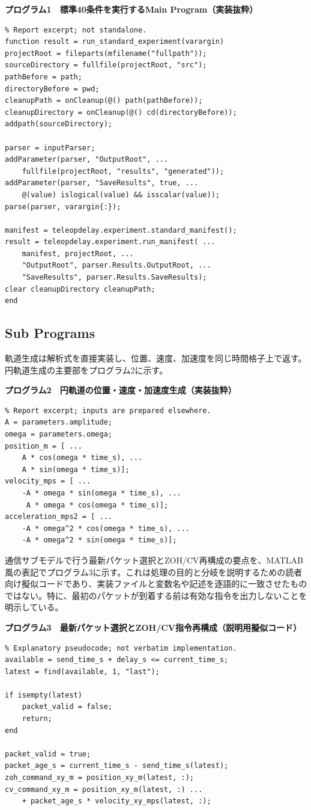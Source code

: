 \documentclass[11pt,a4paper]{article}
\begin{document}
\noindent\textbf{プログラム1　標準40条件を実行するMain Program（実装抜粋）}
\begin{lstlisting}
% Report excerpt; not standalone.
function result = run_standard_experiment(varargin)
projectRoot = fileparts(mfilename("fullpath"));
sourceDirectory = fullfile(projectRoot, "src");
pathBefore = path;
directoryBefore = pwd;
cleanupPath = onCleanup(@() path(pathBefore));
cleanupDirectory = onCleanup(@() cd(directoryBefore));
addpath(sourceDirectory);

parser = inputParser;
addParameter(parser, "OutputRoot", ...
    fullfile(projectRoot, "results", "generated"));
addParameter(parser, "SaveResults", true, ...
    @(value) islogical(value) && isscalar(value));
parse(parser, varargin{:});

manifest = teleopdelay.experiment.standard_manifest();
result = teleopdelay.experiment.run_manifest( ...
    manifest, projectRoot, ...
    "OutputRoot", parser.Results.OutputRoot, ...
    "SaveResults", parser.Results.SaveResults);
clear cleanupDirectory cleanupPath;
end
\end{lstlisting}

\subsection{Sub Programs}

軌道生成は解析式を直接実装し、位置、速度、加速度を同じ時間格子上で返す。円軌道生成の主要部をプログラム2に示す。

\noindent\textbf{プログラム2　円軌道の位置・速度・加速度生成（実装抜粋）}
\begin{lstlisting}
% Report excerpt; inputs are prepared elsewhere.
A = parameters.amplitude;
omega = parameters.omega;
position_m = [ ...
    A * cos(omega * time_s), ...
    A * sin(omega * time_s)];
velocity_mps = [ ...
    -A * omega * sin(omega * time_s), ...
     A * omega * cos(omega * time_s)];
acceleration_mps2 = [ ...
    -A * omega^2 * cos(omega * time_s), ...
    -A * omega^2 * sin(omega * time_s)];
\end{lstlisting}

通信サブモデルで行う最新パケット選択とZOH/CV再構成の要点を、MATLAB風の表記でプログラム3に示す。これは処理の目的と分岐を説明するための読者向け擬似コードであり、実装ファイルと変数名や記述を逐語的に一致させたものではない。特に、最初のパケットが到着する前は有効な指令を出力しないことを明示している。

\noindent\textbf{プログラム3　最新パケット選択とZOH/CV指令再構成（説明用擬似コード）}
\begin{lstlisting}
% Explanatory pseudocode; not verbatim implementation.
available = send_time_s + delay_s <= current_time_s;
latest = find(available, 1, "last");

if isempty(latest)
    packet_valid = false;
    return;
end

packet_valid = true;
packet_age_s = current_time_s - send_time_s(latest);
zoh_command_xy_m = position_xy_m(latest, :);
cv_command_xy_m = position_xy_m(latest, :) ...
    + packet_age_s * velocity_xy_mps(latest, :);
\end{lstlisting}
\end{document}

